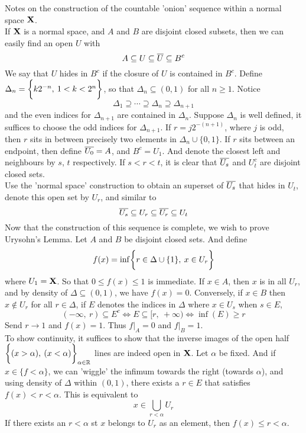 \documentclass[../../main.tex]{subfiles}
\begin{document}
\newpage


Notes on the construction of the countable 'onion' sequence within a normal space ${\mathbf{X}}$.\\

If ${\mathbf{X}}$ is a normal space, and $A$ and $B$ are disjoint closed subsets, then we can easily find an open $U$ with
\begin{equation}\label{eq:UrysohnLemma-Seashells}
    A\subseteq U \subseteq \overline{U}\subseteq B^c
\end{equation}
We say that $U$ hides in $B^c$ if the closure of $U$ is contained in $B^c$. Define $\Delta_n = \biggl\{{k2^{-n},\: 1 < k < 2^{n}}\biggr\}$, so that $\Delta_n\subseteq(0,1)$ for all $n\geq 1$. Notice 
\[
    \Delta_1\supseteq \cdots\supseteq \Delta_n\supseteq \Delta_{n+1}
\]
and the even indices for $\Delta_{n+1}$ are contained in $\Delta_n$. Suppose $\Delta_n$ is well defined, it suffices to choose the odd indices for $\Delta_{n+1}$. If $r = j2^{-(n+1)}$, where $j$ is odd, then $r$ sits in between precisely two elements in $\Delta_n\cup\{0,1\}$. If $r$ sits between an endpoint, then define $\overline{U_0} = A$, and $B^c = U_1$. And denote the closest left and neighbours by $s$, $t$ respectively. If $s<r<t$, it is clear that $\overline{U_s}$ and $U_t^c$ are disjoint closed sets.\\

Use the 'normal space' construction to obtain an superset of $\overline{U_s}$ that hides in $U_t$, denote this open set by $U_r$, and similar to 
\[
    \overline{U_s}\subseteq U_r\subseteq \overline{U_r}\subseteq U_t
\]
Now that the construction of this sequence is complete, we wish to prove Urysohn's Lemma. Let $A$ and $B$ be disjoint closed sets. And define 
\[
    f(x) = \inf\biggl\{{r\in\Delta\cup\{1\},\: x\in U_r}\biggr\}
\]
where $U_1 = {\mathbf{X}}$. So that $0\leq f(x)\leq 1$ is immediate. If $x\in A$, then $x$ is in all $U_r$, and by density of $\Delta\subseteq(0,1)$, we have $f(x)=0$. Conversely, if $x\in B$ then $x\notin U_r$ for all $r\in\Delta$, if $E$ denotes the indices in $\Delta$ where $x\in U_s$ when $s\in E$,
\begin{equation}\label{inequality shortcut infimum intervals}
    (-\infty,\: r)\subseteq E^c\iff E\subseteq [r,\: +\infty)\iff\inf(E)\geq r
\end{equation}
Send $r\to 1$ and $f(x) = 1$. Thus $f|_{A}=0$ and $f|_{B}=1$.\\

To show continuity, it suffices to show that the inverse images of the open half $\biggl\{{(x > \alpha),\: (x < \alpha)}\biggr\}_{\alpha\in\mathbb{R}}$ lines are indeed open in ${\mathbf{X}}$. Let $\alpha$ be fixed. And if $x\in \{f<\alpha\}$, we can 'wiggle' the infimum towards the right (towards $\alpha$), and using density of $\Delta$ within $(0,1)$, there exists a $r\in E$ that satisfies $f(x) < r < \alpha$. This is equivalent to 
\[
    x\in \bigcup_{r<\alpha} U_r
\]
If there exists an $r<\alpha$ st $x$ belongs to $U_r$ as an element, then $f(x)\leq r < \alpha$.\\
\end{document}
